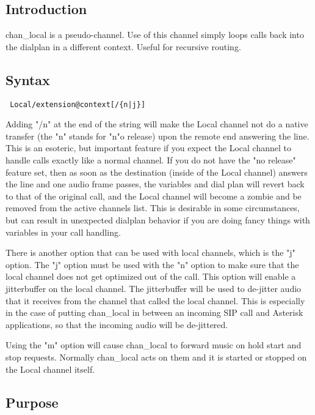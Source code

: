 \subsection{Introduction}

chan\_local is a pseudo-channel. Use of this channel simply loops calls back
into the dialplan in a different context. Useful for recursive routing.

\subsection{Syntax}
\begin{verbatim}
 Local/extension@context[/{n|j}]
\end{verbatim}

Adding "/n" at the end of the string will make the Local channel not do a
native transfer (the "n" stands for "n"o release) upon the remote end answering
the line. This is an esoteric, but important feature if you expect the Local
channel to handle calls exactly like a normal channel. If you do not have the
"no release" feature set, then as soon as the destination (inside of the Local
channel) answers the line and one audio frame passes, the variables and dial plan
will revert back to that of the original call, and the Local channel will become a
zombie and be removed from the active channels list. This is desirable in some
circumstances, but can result in unexpected dialplan behavior if you are doing
fancy things with variables in your call handling.

There is another option that can be used with local channels, which is the "j"
option.  The "j" option must be used with the "n" option to make sure that the
local channel does not get optimized out of the call.  This option will enable
a jitterbuffer on the local channel.  The jitterbuffer will be used to de-jitter
audio that it receives from the channel that called the local channel.  This is
especially in the case of putting chan\_local in between an incoming SIP call
and Asterisk applications, so that the incoming audio will be de-jittered.

Using the "m" option will cause chan\_local to forward music on hold start and stop
requests. Normally chan\_local acts on them and it is started or stopped on the
Local channel itself.

\subsection{Purpose}

